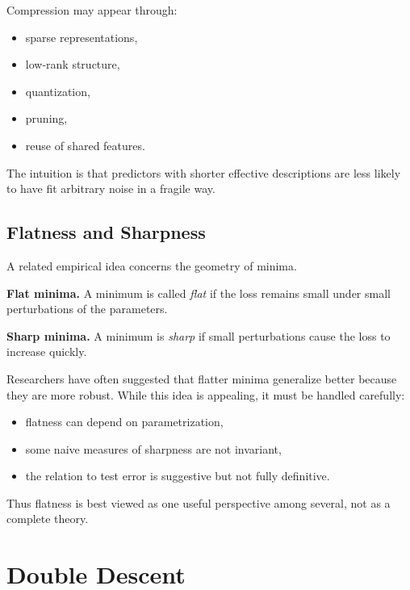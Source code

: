 \noindent
Compression may appear through:
\begin{itemize}
    \item sparse representations,
    \item low-rank structure,
    \item quantization,
    \item pruning,
    \item reuse of shared features.
\end{itemize}

\medskip

\noindent
The intuition is that predictors with shorter effective descriptions are less likely to have fit arbitrary noise in a fragile way.

\subsection{Flatness and Sharpness}

A related empirical idea concerns the geometry of minima.

\medskip

\noindent
\textbf{Flat minima.}
A minimum is called \emph{flat} if the loss remains small under small perturbations of the parameters.

\medskip

\noindent
\textbf{Sharp minima.}
A minimum is \emph{sharp} if small perturbations cause the loss to increase quickly.

\medskip

\noindent
Researchers have often suggested that flatter minima generalize better because they are more robust. While this idea is appealing, it must be handled carefully:
\begin{itemize}
    \item flatness can depend on parametrization,
    \item some naive measures of sharpness are not invariant,
    \item the relation to test error is suggestive but not fully definitive.
\end{itemize}

\medskip

\noindent
Thus flatness is best viewed as one useful perspective among several, not as a complete theory.

\section{Double Descent}


